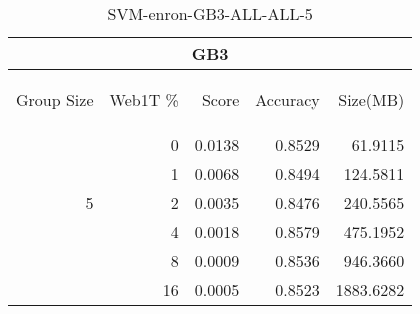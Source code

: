 \begin{center}
\begin{table}[htbp] 
 \begin{center}
\begin{tabular}{ | r | r | r | r | r |}
\hline
\multicolumn{5}{|c|}{GB3}\\
\hline
\begin{sideways}Group Size\end{sideways} & \begin{sideways}Web1T \%\end{sideways} & \begin{sideways}Score\end{sideways} & \begin{sideways}Accuracy\end{sideways} & \begin{sideways}Size(MB)\end{sideways}\\
\hline
\multirow{5}{*}{5}
 & 0 & 0.0138 & 0.8529 & 61.9115\\ \cline{2-5}
 & 1 & 0.0068 & 0.8494 & 124.5811\\ \cline{2-5}
 & 2 & 0.0035 & 0.8476 & 240.5565\\ \cline{2-5}
 & 4 & 0.0018 & 0.8579 & 475.1952\\ \cline{2-5}
 & 8 & 0.0009 & 0.8536 & 946.3660\\ \cline{2-5}
 & 16 & 0.0005 & 0.8523 & 1883.6282\\ \cline{2-5}
\hline
\end{tabular}
\caption{SVM-enron-GB3-ALL-ALL-5}
\label{table:SVM-enron-GB3-ALL-ALL-5}
\end{center}
 \end{table}
\end{center}

